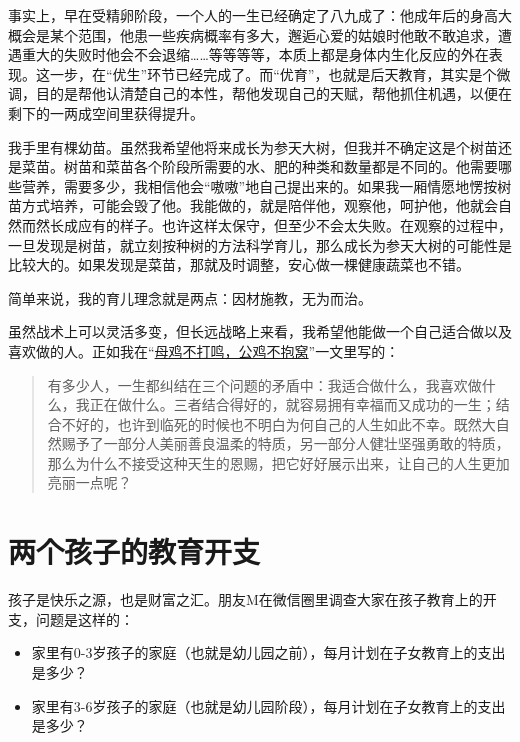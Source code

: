 \documentclass[twoside,openright,headings=optiontohead]{ctexbook} %
\providecommand{\tightlist}{%
   \setlength{\itemsep}{0pt}\setlength{\parskip}{0pt}}
\begin{document}
{事实上，早在受精卵阶段，一个人的一生已经确定了八九成了：他成年后的身高大概会是某个范围，他患一些疾病概率有多大，邂逅心爱的姑娘时他敢不敢追求，遭遇重大的失败时他会不会退缩\ldots{}\ldots{}等等等等，本质上都是身体内生化反应的外在表现。这一步，在``优生''环节已经完成了。而``优育''，也就是后天教育，其实是个微调，目的是帮他认清楚自己的本性，帮他发现自己的天赋，帮他抓住机遇，以便在剩下的一两成空间里获得提升。

我手里有棵幼苗。虽然我希望他将来成长为参天大树，但我并不确定这是个树苗还是菜苗。树苗和菜苗各个阶段所需要的水、肥的种类和数量都是不同的。他需要哪些营养，需要多少，我相信他会``嗷嗷''地自己提出来的。如果我一厢情愿地愣按树苗方式培养，可能会毁了他。我能做的，就是陪伴他，观察他，呵护他，他就会自然而然长成应有的样子。也许这样太保守，但至少不会太失败。在观察的过程中，一旦发现是树苗，就立刻按种树的方法科学育儿，那么成长为参天大树的可能性是比较大的。如果发现是菜苗，那就及时调整，安心做一棵健康蔬菜也不错。

简单来说，我的育儿理念就是两点：因材施教，无为而治。

虽然战术上可以灵活多变，但长远战略上来看，我希望他能做一个自己适合做以及喜欢做的人。正如我在``\href{http://dapengde.com/archives/13233}{母鸡不打鸣，公鸡不抱窝}''一文里写的：

\begin{quote}
有多少人，一生都纠结在三个问题的矛盾中：我适合做什么，我喜欢做什么，我正在做什么。三者结合得好的，就容易拥有幸福而又成功的一生；结合不好的，也许到临死的时候也不明白为何自己的人生如此不幸。既然大自然赐予了一部分人美丽善良温柔的特质，另一部分人健壮坚强勇敢的特质，那么为什么不接受这种天生的恩赐，把它好好展示出来，让自己的人生更加亮丽一点呢？
\end{quote}

\chapter*{两个孩子的教育开支}\label{edu-cost}

孩子是快乐之源，也是财富之汇。朋友M在微信圈里调查大家在孩子教育上的开支，问题是这样的：

\begin{itemize}
\tightlist
\item
  家里有0-3岁孩子的家庭（也就是幼儿园之前），每月计划在子女教育上的支出是多少？
\item
  家里有3-6岁孩子的家庭（也就是幼儿园阶段），每月计划在子女教育上的支出是多少？
\end{itemize}

}
\end{document}
